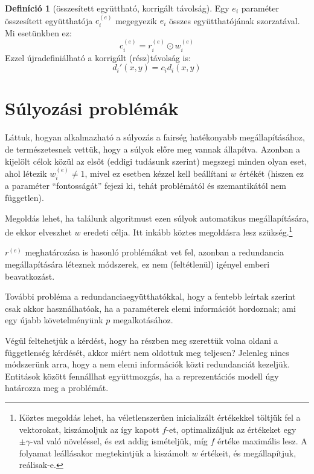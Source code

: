 \documentclass[twocolumn]{article}
\theoremstyle{definition}
\newtheorem{definition}{Definíció}[section]
\newcommand{\ent}[2]{ {#1}^{(#2)} }
\begin{document}
    \begin{definition}[összesített együttható, korrigált távolság]
        Egy $e_i$ paraméter összesített együtthatója $\ent c e _i$ megegyezik $e_i$ összes együtthatójának szorzatával. Mi esetünkben ez:
        \begin{equation}
            \ent c e _i = \ent r e _i \odot \ent w e _i
        \end{equation}
        Ezzel újradefiniálható a korrigált (rész)távolság is:
        \begin{equation}
            d_i'(x, y) = c_i d_i(x, y)
        \end{equation}
    \end{definition}

\section{Súlyozási problémák}
    Láttuk, hogyan alkalmazható a súlyozás a fairség hatékonyabb megállapításához, de természetesnek vettük, hogy a súlyok előre meg vannak állapítva. Azonban a kijelölt célok közül az elsőt (eddigi tudásunk szerint) megszegi minden olyan eset, ahol létezik $\ent w e _i \neq 1$, mivel ez esetben kézzel kell beállítani $w$ értékét (hiszen ez a paraméter \enquote{fontosságát} fejezi ki, tehát problémától és szemantikától nem független).
    
    Megoldás lehet, ha találunk algoritmust ezen súlyok automatikus megállapítására, de ekkor elveszhet $w$ eredeti célja. Itt inkább köztes megoldásra lesz szükség.\footnote{Köztes megoldás lehet, ha véletlenszerűen inicializált értékekkel töltjük fel a vektorokat, kiszámoljuk az így kapott $f$-et, optimalizáljuk az értékeket egy $\pm \gamma$-val való növeléssel, és ezt addig ismételjük, míg $f$ értéke maximális lesz. A folyamat leállásakor megtekintjük a kiszámolt $w$ értékeit, és megállapítjuk, reálisak-e.}
    
    $\ent r e$ meghatározása is hasonló problémákat vet fel, azonban a redundancia megállapítására léteznek módszerek, ez nem (feltétlenül) igényel emberi beavatkozást.
    
    További probléma a redundanciaegyütthatókkal, hogy a fentebb leírtak szerint csak akkor használhatóak, ha a paraméterek elemi információt hordoznak; ami egy újabb követelményünk $p$ megalkotásához.
    
    Végül feltehetjük a kérdést, hogy ha részben meg szerettük volna oldani a függetlenség kérdését, akkor miért nem oldottuk meg teljesen? Jelenleg nincs módszerünk arra, hogy a nem elemi információk közti redundanciát kezeljük. Entitások között fennállhat együttmozgás, ha a reprezentációs modell úgy határozza meg a problémát.
    
\end{document}
